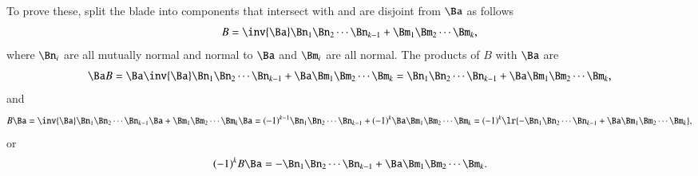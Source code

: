 %
%


To prove these, split the blade into components that intersect with and are disjoint from \( \Ba \) as follows
\begin{dmath}\label{eqn:bladeDotWedgeSymmetryIdentitiesTheorem:240}
B
=
\inv{\Ba} \Bn_1 \Bn_2 \cdots \Bn_{k-1} + \Bm_1 \Bm_2 \cdots \Bm_k,
\end{dmath}
where \( \Bn_i \) are all mutually normal and normal to \( \Ba \) and \( \Bm_i \) are all normal.  The products of \( B \) with \( \Ba \) are
\begin{dmath}\label{eqn:bladeDotWedgeSymmetryIdentitiesTheorem:340}
\Ba B
=
\Ba \inv{\Ba} \Bn_1 \Bn_2 \cdots \Bn_{k-1} + \Ba \Bm_1 \Bm_2 \cdots \Bm_k
=
\Bn_1 \Bn_2 \cdots \Bn_{k-1} + \Ba \Bm_1 \Bm_2 \cdots \Bm_k,
\end{dmath}
and
\begin{dmath}\label{eqn:bladeDotWedgeSymmetryIdentitiesTheorem:360}
B \Ba
=
\inv{\Ba} \Bn_1 \Bn_2 \cdots \Bn_{k-1} \Ba + \Bm_1 \Bm_2 \cdots \Bm_k \Ba
=
(-1)^{k-1} \Bn_1 \Bn_2 \cdots \Bn_{k-1} + (-1)^k \Ba \Bm_1 \Bm_2 \cdots \Bm_k
=
(-1)^k \lr{ - \Bn_1 \Bn_2 \cdots \Bn_{k-1} + \Ba \Bm_1 \Bm_2 \cdots \Bm_k },
\end{dmath}
or
\begin{dmath}\label{eqn:bladeDotWedgeSymmetryIdentitiesTheorem:380}
(-1)^k B \Ba
=
- \Bn_1 \Bn_2 \cdots \Bn_{k-1} + \Ba \Bm_1 \Bm_2 \cdots \Bm_k.
\end{dmath}


